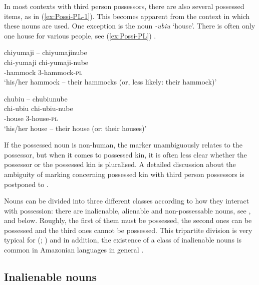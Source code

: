 In most contexts with third person  possessors, there are also several possessed items, as in (\ref{ex:Possi-PL-1}). This becomes apparent from the context in which these nouns are used. One exception is the noun \textit{-ubiu} ‘house’. There is often only one house for various people, see (\ref{ex:Possi-PL}) .

\ea\label{ex:Possi-PL-1}
\begingl
\glpreamble chiyumaji – chiyumajinube\\
\gla chi-yumaji chi-yumaji-nube\\
-hammock 3-hammock-\textsc{pl}\\
\glft ‘his/her hammock – their hammocks (or, less likely: their hammock)’
\endgl
\xe

\ea\label{ex:Possi-PL}
\begingl
\glpreamble chubiu – chubiunube\\
\gla chi-ubiu chi-ubiu-nube\\
-house 3-house-\textsc{pl}\\
\glft ‘his/her house – their house (or: their houses)’
\endgl
\xe

If the possessed noun is non-human, the  marker unambiguously relates to the possessor, but when it comes to possessed kin, it is often less clear whether the possessor or the possessed kin is pluralised. A detailed discussion about the ambiguity of  marking concerning possessed kin with third person possessors is postponed to .

Nouns can be divided into three different classes according to how they interact with possession: there are inalienable, alienable and non-possessable nouns, see ,  and  below. Roughly, the first of them must be possessed, the second ones can be possessed and the third ones cannot be possessed. This tripartite division is very typical for   (\citealp[cf.][82]{Aikhenvald1999}; \citealt[]{Danielsen2014}) and in addition, the existence of a class of inalienable nouns is common in Amazonian languages in general \citep[88, 100]{Krasnoukhova2012}.


\subsection{Inalienable nouns}\label{sec:Inalienables}

